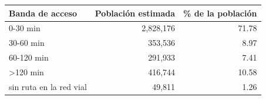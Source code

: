 \begin{tabular}{lrr}
\toprule
Banda de acceso & Población estimada & \% de la población \\
\midrule
0-30 min & 2,828,176 & 71.78 \\
30-60 min & 353,536 & 8.97 \\
60-120 min & 291,933 & 7.41 \\
\textgreater{}120 min & 416,744 & 10.58 \\
sin ruta en la red vial & 49,811 & 1.26 \\
\bottomrule
\end{tabular}
